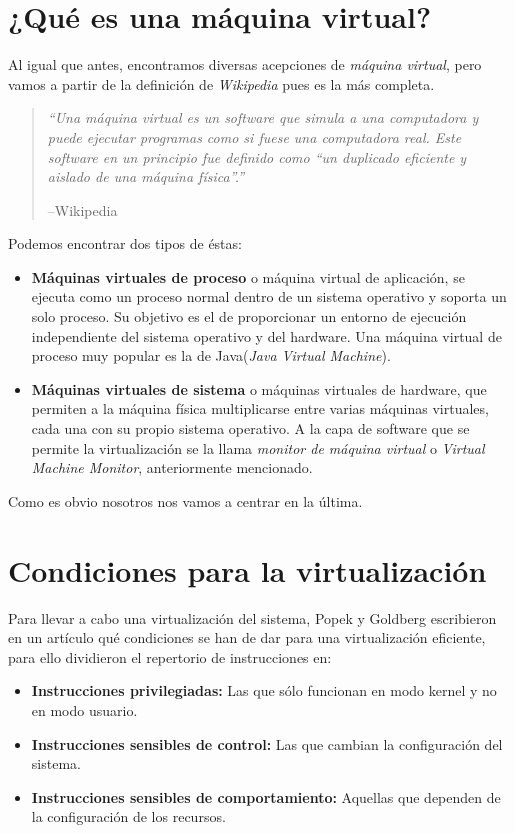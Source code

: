 \section{¿Qué es una máquina virtual?}

\noindent Al igual que antes, encontramos diversas acepciones de \emph{máquina virtual}, pero vamos a partir de la definición de \emph{Wikipedia} pues es la más completa.

\begin{quote}
\emph{\textquotedblleft Una máquina virtual es un software que simula a una computadora y puede ejecutar programas como si fuese una computadora real. Este software en un principio fue definido como \textquotedblleft un duplicado eficiente y aislado de una máquina física\textquotedblright.\textquotedblright}
\begin{flushright}
--Wikipedia\cite{defmaqvirwiki}
\end{flushright}
\end{quote}

\noindent Podemos encontrar dos tipos de éstas:

\begin{itemize}
\item \textbf{Máquinas virtuales de proceso} o máquina virtual de aplicación, se ejecuta como un proceso normal dentro de un sistema operativo y soporta un solo proceso. Su objetivo es el de proporcionar un entorno de ejecución independiente del sistema operativo y del hardware. Una máquina virtual de proceso muy popular es la de Java(\emph{Java Virtual Machine}).
\item \textbf{Máquinas virtuales de sistema} o máquinas virtuales de hardware, que permiten a la máquina física multiplicarse entre varias máquinas virtuales, cada una con su propio sistema operativo. A la capa de software que se permite la virtualización se la llama \emph{monitor de máquina virtual} o \emph{Virtual Machine Monitor}, anteriormente mencionado.
\end{itemize}

\noindent Como es obvio nosotros nos vamos a centrar en la última.

\section{Condiciones para la virtualización}

\noindent Para llevar a cabo una virtualización del sistema, Popek y Goldberg escribieron en un artículo\cite{reqvir} qué condiciones se han de dar para una virtualización eficiente, para ello dividieron el repertorio de instrucciones en:
\begin{itemize}
\item \textbf{Instrucciones privilegiadas:} Las que sólo funcionan en modo kernel y no en modo usuario.
\item \textbf{Instrucciones sensibles de control:} Las que cambian la configuración del sistema.
\item \textbf{Instrucciones sensibles de comportamiento:} Aquellas que dependen de la configuración de los recursos. 
\end{itemize}

